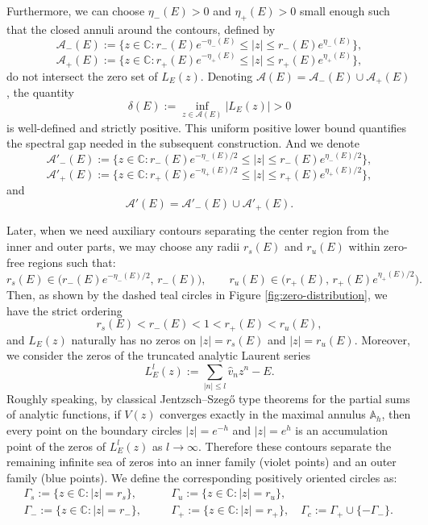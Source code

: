 \documentclass[reqno,11pt]{amsart}
\begin{document}
Furthermore, we can choose $\eta_-(E)>0$ and $\eta_+(E)>0$ small enough such that the closed  annuli around the contours, defined by
$$
\mathcal A_-(E) := \{z\in\mathbb C: r_-(E)e^{-\eta_-(E)} \le |z| \le r_-(E)e^{\eta_-(E)}\},
$$
\begin{equation*}
    \mathcal A_+(E) := \{z\in\mathbb C: r_+(E)e^{-\eta_+(E)} \le |z| \le r_+(E)e^{\eta_+(E)}\},
\end{equation*}
do not intersect the zero set of $L_{E}^{}(z)$. Denoting $\mathcal{A}(E) = \mathcal A_-(E) \cup \mathcal A_+(E)$, the quantity
\begin{equation}\label{delta}
    \delta(E) := \inf_{z\in \mathcal A(E)} |L_{E}^{}(z)|>0
\end{equation}
is well-defined and strictly positive. This uniform positive lower bound quantifies the spectral gap needed in the subsequent construction. And we denote 
$$
\mathcal A'_-(E) := \{z\in\mathbb C: r_-(E)e^{-\eta_-(E)/2} \le |z| \le r_-(E)e^{\eta_-(E)/2}\},
$$
\begin{equation}\label{eq:a+}
    \mathcal A'_+(E) := \{z\in\mathbb C: r_+(E)e^{-\eta_+(E)/2} \le |z| \le r_+(E)e^{\eta_+(E)/2}\},
\end{equation}
and $$\mathcal{A}'(E)=\mathcal A'_-(E)\cup\mathcal A'_+(E).$$



Later, when we need auxiliary contours separating the center region from the inner and outer parts, we may choose any radii $r_s(E)$ and $r_u(E)$ within zero-free regions such that:
$$
r_s(E)\in \bigl(r_-(E)e^{-\eta_-(E)/2},\,r_-(E)\bigr),
\qquad
r_u(E)\in \bigl(r_+(E),\,r_+(E)e^{\eta_+(E)/2}\bigr).
$$
Then, as shown by the dashed teal circles in Figure \ref{fig:zero-distribution}, we have the strict ordering
\begin{equation*}
    r_s(E) < r_-(E) < 1 < r_+(E) < r_u(E),
\end{equation*}
and $L_{E}^{}(z)$ naturally has no zeros on $|z|=r_s(E)$ and $|z|=r_u(E)$.  Moreover, we consider the zeros of the truncated analytic Laurent series   \begin{equation}\label{equ:tsymbol}
    L_{E}^{l}(z) := \sum_{|n|\le l} \hat{v}_n z^n - E.
\end{equation}
Roughly speaking, by classical Jentzsch--Szeg\H{o} type theorems  \cite{Jen,PPS} for the partial sums of analytic functions, if $V(z)$ converges exactly in the maximal annulus $\mathbb A_{h}$, then every point on the boundary circles $|z|=e^{-h}$ and $|z|=e^{h}$ is an accumulation point of the zeros of $L_{E}^{l}(z)$ as $l \to \infty$.    Therefore these contours separate the remaining infinite sea of zeros into an inner family (violet points) and an outer family (blue points).
We define the corresponding positively oriented circles as:
\begin{equation}\label{contour}
\begin{aligned}
    &\Gamma_s := \{z\in\mathbb C: |z|=r_s\}, \quad
    &&\Gamma_u := \{z\in\mathbb C: |z|=r_u\}, \\
    &\Gamma_- := \{z\in\mathbb C: |z|=r_-\}, \quad
    &&\Gamma_+ := \{z\in\mathbb C: |z|=r_+\}, \quad\Gamma_c := \Gamma_+ \cup \{-\Gamma_-\}. \quad
\end{aligned}
\end{equation}
\end{document}
